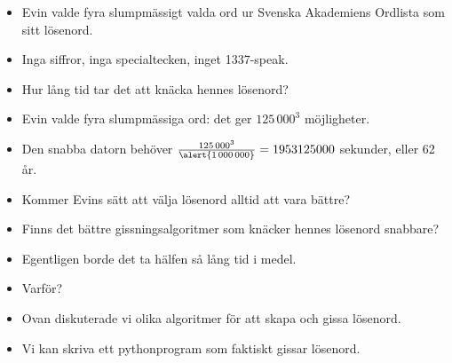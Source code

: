 \begin{frame}
  \begin{exercise}
    \begin{itemize}
      \item Evin valde fyra slumpmässigt valda ord ur Svenska Akademiens 
        Ordlista som sitt lösenord.
      \item Inga siffror, inga specialtecken, inget 1337-speak.
      \item Hur lång tid tar det att knäcka hennes lösenord?
    \end{itemize}
  \end{exercise}
\end{frame}

\begin{frame}
  \begin{solution}
    \begin{itemize}
      \item Evin valde fyra slumpmässiga ord: det ger \(125\,000^3\) 
        möjligheter.
      \item Den \alert{snabba} datorn behöver 
        \(\frac{125\,000^3}{\alert{1\,000\,000}} = 1953125000\) sekunder, eller 
        62 år.
    \end{itemize}
  \end{solution}
\end{frame}

\begin{frame}
  \begin{question}
    \begin{itemize}
      \item Kommer Evins sätt att välja lösenord alltid att vara bättre?
      \item Finns det bättre gissningsalgoritmer som knäcker hennes lösenord 
        snabbare?
    \end{itemize}
  \end{question}
\end{frame}

\begin{frame}
  \begin{question}
    \begin{itemize}
      \item Egentligen borde det ta hälfen så lång tid i medel.
      \item Varför?
    \end{itemize}
  \end{question}
\end{frame}

\begin{frame}
  \begin{remark}[Algoritmer]
    \begin{itemize}
      \item Ovan diskuterade vi olika algoritmer för att skapa och gissa 
        lösenord.
      \item Vi kan skriva ett pythonprogram som faktiskt gissar lösenord.
    \end{itemize}
  \end{remark}
\end{frame}

